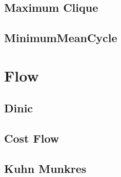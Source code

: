 \documentclass[a4paper,10pt,twocolumn,oneside]{article}
\begin{document}
%

\subsection{Maximum Clique}


\subsection{MinimumMeanCycle}


\section{Flow}
%

\subsection{Dinic} %


\subsection{Cost Flow} %


%

\subsection{Kuhn Munkres}


%
\end{document}

